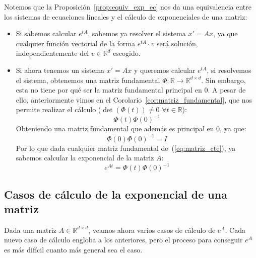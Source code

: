 \begin{observacion}
    Notemos que la Proposición~\ref{prop:equiv_exp_ec} nos da una equivalencia entre los sistemas de ecuaciones lineales y el cálculo de exponenciales de una matriz:
    \begin{itemize}
        \item Si sabemos calcular $e^{tA}$, sabemos ya resolver el sistema $x'=Ax$, ya que cualquier función vectorial de la forma $e^{tA}\cdot v$ será solución, independientemente del $v\in \mathbb{R}^d$ escogido.
        \item Si ahora tenemos un sistema $x'=Ax$ y queremos calcular $e^{tA}$, si resolvemos el sistema, obtenemos una matriz fundamental $\Phi:\mathbb{R}\rightarrow\mathbb{R}^{d\times d}$. Sin embargo, esta no tiene por qué ser la matriz fundamental principal en 0. A pesar de ello, anteriormente vimos en el Corolario~\ref{cor:matriz_fundamental}, que nos permite realizar el cálculo ($\det(\Phi(t))\neq 0$ $\forall t\in \mathbb{R}$):
            \begin{equation*}
                \Phi(t)\Phi(0)^{-1}
            \end{equation*}
            Obteniendo una matriz fundamental que además es principal en $0$, ya que:
            \begin{equation*}
                \Phi(0)\Phi(0)^{-1} = I
            \end{equation*}
            Por lo que dada cualquier matriz fundamental de~(\ref{eq:matriz_cte}), ya sabemos calcular la exponencial de la matriz $A$:
            \begin{equation*}
                e^{At} = \Phi(t)\Phi(0)^{-1}
            \end{equation*}
    \end{itemize}
\end{observacion}

\subsection{Casos de cálculo de la exponencial de una matriz}
Dada una matriz $A\in \mathbb{R}^{d\times d}$, veamos ahora varios casos de cálculo de $e^A$. Cada nuevo caso de cálculo engloba a los anteriores, pero el proceso para conseguir $e^A$ es más difícil cuanto más general sea el caso.

